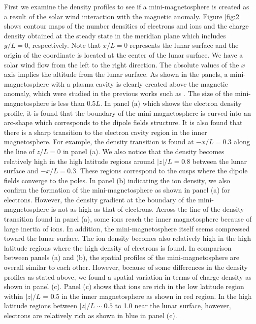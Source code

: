 \documentclass[draft,jgrga]{agutex2015}
\begin{document}
\begin{article}
First we examine the density profiles to see 
if a mini-magnetosphere is created as a result of 
the solar wind interaction with the magnetic anomaly.
Figure \ref{fig:2} shows contour maps of the number densities of electrons and ions  
and the charge density obtained at the steady state 
in the meridian plane which includes $y/L = 0$, respectively. 
Note that $x/L=0$ represents the lunar surface and 
the origin of the coordinate is located at the center of the lunar surface.
We have a solar wind flow from the left to the right direction. 
The absolute values of the $x$ axis implies the altitude from the lunar surface.
As shown in the panels, a mini-magnetosphere with a plasma cavity is clearly 
created above the magnetic anomaly, 
which were studied in the previous works such as
\citep[e.g.][]{Harnett2000,Harnett2003,Halekas2008b,Bamford2012}.
The size of the mini-magnetosphere is less than $0.5L$.
In panel (a) which shows the electron density profile, 
it is found that the boundary of the mini-magnetosphere is curved 
into an arc-shape which corresponds to the dipole fields structure.
It is also found that there is a sharp transition to 
the electron cavity region in the inner magnetosphere. 
For example, 
the density transition is found at $-x/L = 0.3$ 
along the line of $z/L =0$ in panel (a).
We also notice that the density becomes relatively high 
in the high latitude regions around
$|z|/L=0.8$ between the lunar surface and $-x/L=0.3$.
These regions correspond to the cusps where the dipole fields converge to the poles.
In panel (b) indicating the ion density, 
we also confirm the formation of the mini-magnetosphere as shown in panel (a) for electrons.
However, 
the density gradient at the boundary of the mini-magnetosphere is 
not as high as that of electrons.
Across the line of the density transition found in panel (a), 
some ions reach the inner magnetosphere because of large inertia of ions. 
In addition, the mini-magnetosphere itself seems compressed toward the lunar surface.
The ion density becomes also relatively high in the high latitude regions 
where the high density of electrons is found. 
In comparison between panels (a) and (b), 
the spatial profiles of the mini-magnetosphere are overall similar to each other. 
However, because of some differences in the density profiles as stated above, 
we found a spatial variation in terms of charge density as shown in panel (c). 
Panel (c) shows that ions are rich in the low latitude region 
within $|z|/L$ = 0.5 in the inner magnetosphere as shown in red region. 
In the high latitude regions between $|z|/L \sim 0.5$ to 1.0 near the lunar surface, 
however, electrons are relatively rich as shown in blue in panel (c).


\end{article}
\end{document}
